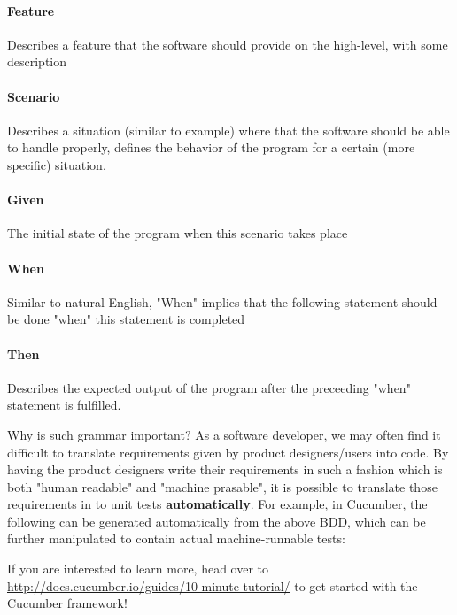 \paragraph{Feature}

Describes a feature that the software should provide on the high-level, with some description

\paragraph{Scenario}

Describes a situation (similar to example) where that the software should be able to handle properly, defines the behavior of the program for a certain (more specific) situation. 

\paragraph{Given}

The initial state of the program when this scenario takes place

\paragraph{When}

Similar to natural English, "When" implies that the following statement should be done "when" this statement is completed

\paragraph{Then}

Describes the expected output of the program after the preceeding "when" statement is fulfilled. 

Why is such grammar important? As a software developer, we may often find it difficult to translate requirements given by product designers/users into code. By having the product designers write their requirements in such a fashion which is both "human readable" and "machine prasable", it is possible to translate those requirements in to unit tests \textbf{automatically}. For example, in Cucumber, the following can be generated automatically from the above BDD, which can be further manipulated to contain actual machine-runnable tests:


If you are interested to learn more, head over to \url{http://docs.cucumber.io/guides/10-minute-tutorial/} to get started with the Cucumber framework!


